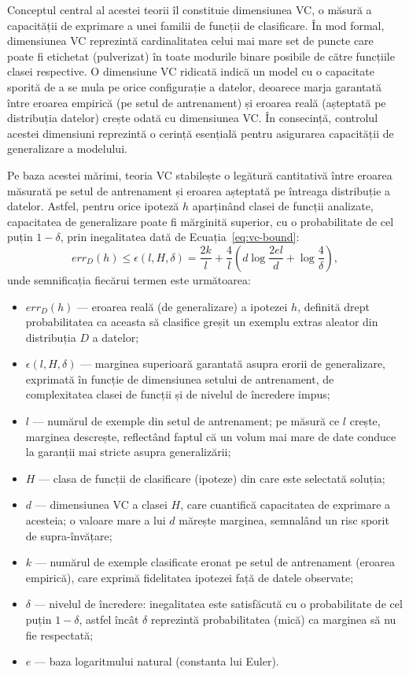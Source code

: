 Conceptul central al acestei teorii îl constituie dimensiunea VC, o măsură a capacității de exprimare a unei familii de funcții de clasificare. În mod formal, dimensiunea VC reprezintă cardinalitatea celui mai mare set de puncte care poate fi etichetat (pulverizat) în toate modurile binare posibile de către funcțiile clasei respective. O dimensiune VC ridicată indică un model cu o capacitate sporită de a se mula pe orice configurație a datelor, deoarece marja garantată între eroarea empirică (pe setul de antrenament) și eroarea reală (așteptată pe distribuția datelor) crește odată cu dimensiunea VC. În consecință, controlul acestei dimensiuni reprezintă o cerință esențială pentru asigurarea capacității de generalizare a modelului.

Pe baza acestei mărimi, teoria VC stabilește o legătură cantitativă între eroarea măsurată pe setul de antrenament și eroarea așteptată pe întreaga distribuție a datelor. Astfel, pentru orice ipoteză $h$ aparținând clasei de funcții analizate, capacitatea de generalizare poate fi mărginită superior, cu o probabilitate de cel puțin $1-\delta$, prin inegalitatea dată de Ecuația~\ref{eq:vc-bound}:
  \begin{equation}
    err_{D}(h) \leq \epsilon(l, H, \delta) = \frac{2k}{l} + \frac{4}{l} \left( d\log{\frac{2el}{d}} + \log{\frac{4}{\delta}} \right),
    \label{eq:vc-bound}
  \end{equation}
unde semnificația fiecărui termen este următoarea:
\begin{itemize}
  \item $err_{D}(h)$ --- eroarea reală (de generalizare) a ipotezei $h$, definită drept probabilitatea ca aceasta să clasifice greșit un exemplu extras aleator din distribuția $D$ a datelor;
  \item $\epsilon(l, H, \delta)$ --- marginea superioară garantată asupra erorii de generalizare, exprimată în funcție de dimensiunea setului de antrenament, de complexitatea clasei de funcții și de nivelul de încredere impus;
  \item $l$ --- numărul de exemple din setul de antrenament; pe măsură ce $l$ crește, marginea descrește, reflectând faptul că un volum mai mare de date conduce la garanții mai stricte asupra generalizării;
  \item $H$ --- clasa de funcții de clasificare (ipoteze) din care este selectată soluția;
  \item $d$ --- dimensiunea VC a clasei $H$, care cuantifică capacitatea de exprimare a acesteia; o valoare mare a lui $d$ mărește marginea, semnalând un risc sporit de supra-învățare;
  \item $k$ --- numărul de exemple clasificate eronat pe setul de antrenament (eroarea empirică), care exprimă fidelitatea ipotezei față de datele observate;
  \item $\delta$ --- nivelul de încredere: inegalitatea este satisfăcută cu o probabilitate de cel puțin $1-\delta$, astfel încât $\delta$ reprezintă probabilitatea (mică) ca marginea să nu fie respectată;
  \item $e$ --- baza logaritmului natural (constanta lui Euler).
\end{itemize}


